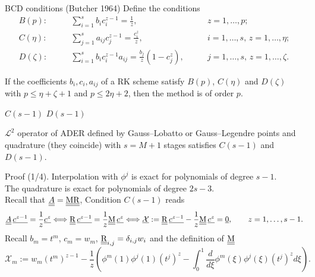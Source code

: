 \documentclass[aspectratio=169]{beamer}
\begin{document}
\begin{frame}{BCD conditions (Butcher 1964)}
	Define the conditions
\begin{align}
	B(p):\qquad  & \sum_{i=1}^s b_i c_i^{z-1}=\frac1z,\qquad & z=1,\dots,p;\\
	C(\eta):\qquad  & \sum_{j=1}^s a_{ij} c_j^{z-1}=\frac{c_i^z}{z},\qquad & 
	i=1,\dots,s,\,z=1,\dots,\eta;\\
	D(\zeta):\qquad  & \sum_{i=1}^s b_i c_i^{z-1}a_{ij}=\frac{b_j}{z}(1-c_j^z),
	\qquad &j=1,\dots,s,\, z=1,\dots,\zeta. 
\end{align}
\begin{theorem}[Butcher 1964]
	If the coefficients $b_i,c_i,a_{ij}$ of a RK scheme satisfy $B(p)$,
    $C(\eta)$ and $D(\zeta)$ with $p\leq \eta +\zeta +1$ and $p\leq 2\eta +2$, 
	then the method is of order $p$.
\end{theorem}
\end{frame}

\begin{frame}{$C(s-1)$ $D(s-1)$}
	\begin{lemma}
		$\mathcal{L}^2$ operator of ADER defined by Gauss--Lobatto or Gauss--Legendre points and quadrature (they coincide) with $s=M+1$ stages satisfies
		 $C(s-1)$ and $D(s-1)$.
	\end{lemma}
	\begin{block}{Proof (1/4).}
		Interpolation with $\phi^j$ is exact for polynomials
		 of degree $s-1$.\\
		The quadrature is exact for polynomials of degree $2s-3$.\\
		Recall that $\underline{\underline{A}} = \underline{\underline{\mathrm{M}}} \underline{\underline{\mathrm{R}}}$, Condition $C(s-1)$  reads  \vspace*{-2mm}
		\begin{equation*}
			\underline{\underline{A}}\, \underline{c^{z-1}}  = \frac{1}{z}\underline{c^z} 
			\Longleftrightarrow \RHS \, 
			\underline{c^{z-1}}= \frac{1}{z} \M\,\underline{c^z}
			\Longleftrightarrow \underline{\mathcal{X}}:=\RHS \, 
			\underline{c^{z-1}}- \frac{1}{z} \M\,\underline{c^z}=\underline{0}, 
			\qquad z=1,\dots, s-1.\vspace*{-2mm}
		\end{equation*}
		Recall $b_m=t^m$, $c_m=w_m$, $\underline{\underline{\mathrm{R}}}_{i,j}=\delta_{i,j}w_i$ and the definition of $\underline{\underline{\mathrm{M}}}$\vspace*{-2mm}
		\begin{equation*}
			\mathcal{X}_m:=w_m (t^{m})^{z-1} - \frac{1}{z} \left( \phi^m (1) \phi^j (1) (t^j)^z -
			 \int_0^1 \frac{d}{d\xi}\phi^m(\xi) \phi^j(\xi)(t^j)^z  d\xi  \right).
		\end{equation*}
	\end{block}
\end{frame}
\end{document}

